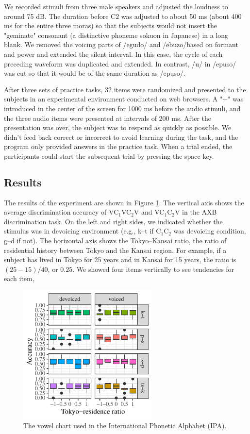 \documentclass[a4paper,11pt,twocolumn]{article}
\begin{document}
We recorded stimuli from three male speakers and adjusted the loudness to around 75 dB. The duration before C2 was adjusted to about 50 ms (about 400 ms for the entire three moras) so that the subjects would not insert the "geminate" consonant (a distinctive phoneme sokuon in Japanese) in a long blank. We removed the voicing parts of /egudo/ and /ebuzo/based on formant and power and extended the silent interval. In this case, the cycle of each preceding waveform was duplicated and extended. In contrast, /u/ in /epuso/ was cut so that it would be of the same duration as /epuso/.

After three sets of practice tasks, 32 items were randomized and presented to the subjects in an experimental environment conducted on web browsers. A "+" was introduced in the center of the screen for 1000 ms before the audio stimuli, and the three audio items were presented at intervals of 200 ms. After the presentation was over, the subject was to respond as quickly as possible. We didn't feed back correct or incorrect to avoid learning during the task, and the program only provided answers in the practice task. When a trial ended, the participants could start the subsequent trial by pressing the space key.

\subsection{Results}

The results of the experiment are shown in Figure \ref{fig:axb_results}. The vertical axis shows the average discrimination accuracy of VC$_\text{1}$VC$_\text{2}$V and VC$_\text{1}$C$_\text{2}$V in the AXB discrimination task. On the left and right sides, we indicated whether the stimulus was in devoicing environment (e.g., k--t if C$_\text{1}$C$_\text{2}$ was devoicing condition, g--d if not). The horizontal axis shows the Tokyo--Kansai ratio, the ratio of residential history between Tokyo and the Kansai region. For example, if a subject has lived in Tokyo for 25 years and in Kansai for 15 years, the ratio is $(25-15)/40$, or $0.25$. We showed four items vertically to see tendencies for each item,

\begin{figure}[!ht]
\begin{center}
\includegraphics[width=7cm]{../results/artifact/results_axb_allophone.pdf}
\caption{The vowel chart used in the International Phonetic
Alphabet (IPA).}\label{fig:axb_results}
\end{center}
\end{figure}
\end{document}

